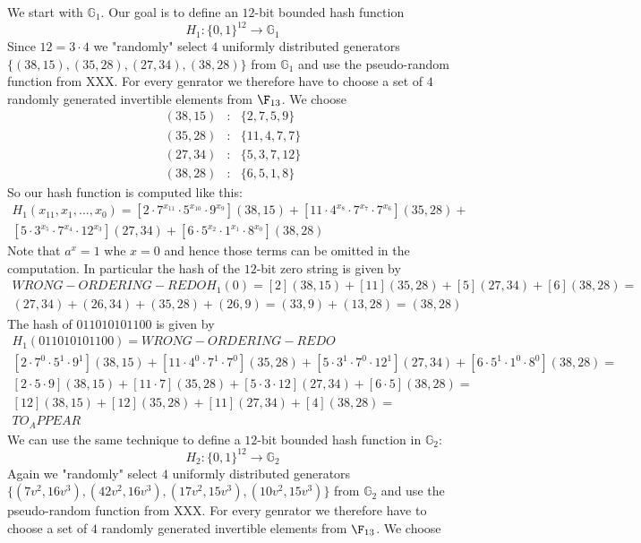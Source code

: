 We start with $\mathbb{G}_1$. Our goal is to define an $12$-bit bounded hash function
$$
H_{1}: \{0,1\}^{12} \to \mathbb{G}_1 
$$
Since $12= 3\cdot 4$ we "randomly" select $4$ uniformly distributed generators $\{(38, 15), (35,28), (27, 34), (38, 28)\}$ from $\mathbb{G}_1$ and use the pseudo-random function from XXX. 
For every genrator we therefore have to choose a set of $4$ randomly generated invertible elements from $\F_{13}$. We choose
$$
\begin{array}{lcl}
(38,15) &:& \{2,7,5,9\}\\
(35,28) &:& \{11,4,7,7\}\\
(27,34) &:& \{5,3,7,12\}\\
(38,28) &:& \{6,5,1,8\}
\end{array}
$$
So our hash function is computed like this:
\begin{multline*}
H_1(x_{11},x_1,\ldots, x_{0})=
[2\cdot 7^{x_{11}}\cdot 5^{x_{10}}\cdot 9^{x_9}](38,15)+
[11\cdot 4^{x_8}\cdot 7^{x_7}\cdot 7^{x_6}](35,28)+\\
[5\cdot 3^{x_5}\cdot 7^{x_4}\cdot 12^{x_3}](27,34) +
[6\cdot 5^{x_2}\cdot 1^{x_{1}}\cdot 8^{x_{0}}](38,28)
\end{multline*}
Note that $a^x=1$ whe $x=0$ and hence those terms can be omitted in the computation. 
In particular the hash of the $12$-bit zero string is given by 
\begin{multline*}WRONG-ORDERING-REDO
H_1(0)= [2](38,15)+[11](35,28)+[5](27,34)+[6](38,28)= \\
(27,34)+(26,34)+(35,28)+(26,9)= (33,9) + (13,28) = (38,28)
\end{multline*}
The hash of $011010101100$ is given by 
\begin{multline*}
H_1(011010101100)=WRONG-ORDERING-REDO\\
[2\cdot 7^{0}\cdot 5^{1}\cdot 9^{1}](38,15)+
[11\cdot 4^{0}\cdot 7^{1}\cdot 7^{0}](35,28)+
[5\cdot 3^{1}\cdot 7^{0}\cdot 12^{1}](27,34) +
[6\cdot 5^{1}\cdot 1^{0}\cdot 8^{0}](38,28)=\\
[2\cdot 5\cdot 9](38,15)+
[11\cdot 7](35,28)+
[5\cdot 3\cdot 12](27,34) +
[6\cdot 5](38,28)=\\
[12](38,15)+
[12](35,28)+
[11](27,34) +
[4](38,28)=\\ 
TO_APPEAR
\end{multline*}
We can use the same technique to define a $12$-bit bounded hash function in $\mathbb{G}_2$:  
$$
H_{2}: \{0,1\}^{12} \to \mathbb{G}_2 
$$
Again we "randomly" select $4$ uniformly distributed generators $\{(7v^2 , 16v^3 ), (42v^2 , 16v^3 ), (17v^2 , 15v^3 ), (10v^2 , 15v^3 )\}$ from $\mathbb{G}_2$ and use the pseudo-random function from XXX. For every genrator we therefore have to choose a set of $4$ randomly generated invertible elements from $\F_{13}$. We choose
